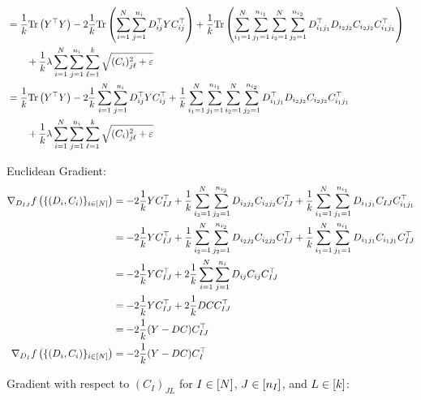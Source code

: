 \begin{align}
    \\
    &= \frac{1}{k} \text{Tr}\left( Y^\top Y \right)
    - 2\frac{1}{k} \text{Tr}\left( \sum_{i=1}^N \sum_{j=1}^{n_i} D_{ij}^\top Y C_{ij}^\top \right)
    + \frac{1}{k} \text{Tr}\left( \sum_{i_1=1}^N \sum_{j_1=1}^{n_{i_1}} \sum_{i_2=1}^N \sum_{j_2=1}^{n_{i_2}} D_{i_1j_1}^\top D_{i_2j_2} C_{i_2j_2} C_{i_1j_1}^\top \right) \\
    &\qquad + \frac{1}{k} \lambda \sum_{i=1}^N \sum_{j=1}^{n_i} \sum_{\ell=1}^k \sqrt{(C_i)_{j\ell}^2 + \varepsilon}
    \\
    &= \frac{1}{k} \text{Tr}\left( Y^\top Y \right)
    - 2 \frac{1}{k} \sum_{i=1}^N \sum_{j=1}^{n_i} D_{ij}^\top Y C_{ij}^\top
    + \frac{1}{k} \sum_{i_1=1}^N \sum_{j_1=1}^{n_{i_1}} \sum_{i_2=1}^N \sum_{j_2=1}^{n_{i_2}} D_{i_1j_1}^\top D_{i_2j_2} C_{i_2j_2} C_{i_1j_1}^\top \\
    &\qquad + \frac{1}{k} \lambda \sum_{i=1}^N \sum_{j=1}^{n_i} \sum_{\ell=1}^k \sqrt{(C_i)_{j\ell}^2 + \varepsilon}
\end{align}

Euclidean Gradient:
\begin{align}
    \nabla_{D_{IJ}} f\left(\{(D_i,C_i)\}_{i\in[N]}\right)
    &= -2 \frac{1}{k} Y C_{IJ}^\top
    + \frac{1}{k} \sum_{i_2=1}^N \sum_{j_2=1}^{n_{i_2}} D_{i_2j_2} C_{i_2j_2} C_{IJ}^\top
    + \frac{1}{k} \sum_{i_1=1}^N \sum_{j_1=1}^{n_{i_1}} D_{i_1j_1} C_{IJ} C_{i_1j_1}^\top
    \\
    &= -2 \frac{1}{k} Y C_{IJ}^\top
    + \frac{1}{k} \sum_{i_2=1}^N \sum_{j_2=1}^{n_{i_2}} D_{i_2j_2} C_{i_2j_2} C_{IJ}^\top
    + \frac{1}{k} \sum_{i_1=1}^N \sum_{j_1=1}^{n_{i_1}} D_{i_1j_1} C_{i_1j_1} C_{IJ}^\top
    \\
    &= -2 \frac{1}{k} Y C_{IJ}^\top
    + 2 \frac{1}{k} \sum_{i=1}^N \sum_{j=1}^{n_i} D_{ij} C_{ij} C_{IJ}^\top
    \\
    &= -2 \frac{1}{k} Y C_{IJ}^\top
    + 2 \frac{1}{k} DC C_{IJ}^\top
    \\
    &= -2 \frac{1}{k} (Y - DC) C_{IJ}^\top
    \\
    \nabla_{D_I} f\left(\{(D_i,C_i)\}_{i\in[N]}\right)
    &= -2 \frac{1}{k} (Y - DC) C_{I}^\top
\end{align}

Gradient with respect to $(C_I)_{JL}$ for $I\in[N]$, $J\in[n_I]$, and $L\in[k]$:

